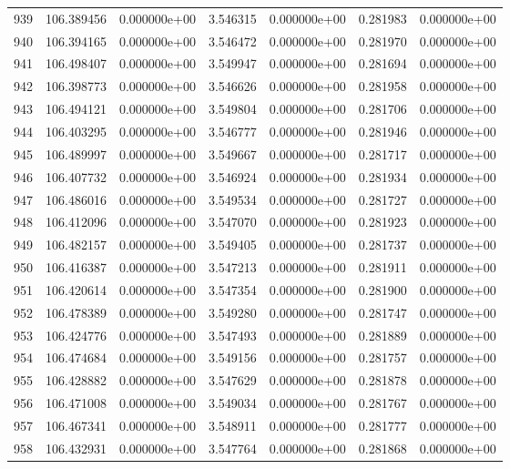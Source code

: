 \begin{tabular}{rrrrrrr}
 939 & 106.389456 &  0.000000e+00 &  3.546315 &  0.000000e+00 &    0.281983 &  0.000000e+00 \\
 940 & 106.394165 &  0.000000e+00 &  3.546472 &  0.000000e+00 &    0.281970 &  0.000000e+00 \\
 941 & 106.498407 &  0.000000e+00 &  3.549947 &  0.000000e+00 &    0.281694 &  0.000000e+00 \\
 942 & 106.398773 &  0.000000e+00 &  3.546626 &  0.000000e+00 &    0.281958 &  0.000000e+00 \\
 943 & 106.494121 &  0.000000e+00 &  3.549804 &  0.000000e+00 &    0.281706 &  0.000000e+00 \\
 944 & 106.403295 &  0.000000e+00 &  3.546777 &  0.000000e+00 &    0.281946 &  0.000000e+00 \\
 945 & 106.489997 &  0.000000e+00 &  3.549667 &  0.000000e+00 &    0.281717 &  0.000000e+00 \\
 946 & 106.407732 &  0.000000e+00 &  3.546924 &  0.000000e+00 &    0.281934 &  0.000000e+00 \\
 947 & 106.486016 &  0.000000e+00 &  3.549534 &  0.000000e+00 &    0.281727 &  0.000000e+00 \\
 948 & 106.412096 &  0.000000e+00 &  3.547070 &  0.000000e+00 &    0.281923 &  0.000000e+00 \\
 949 & 106.482157 &  0.000000e+00 &  3.549405 &  0.000000e+00 &    0.281737 &  0.000000e+00 \\
 950 & 106.416387 &  0.000000e+00 &  3.547213 &  0.000000e+00 &    0.281911 &  0.000000e+00 \\
 951 & 106.420614 &  0.000000e+00 &  3.547354 &  0.000000e+00 &    0.281900 &  0.000000e+00 \\
 952 & 106.478389 &  0.000000e+00 &  3.549280 &  0.000000e+00 &    0.281747 &  0.000000e+00 \\
 953 & 106.424776 &  0.000000e+00 &  3.547493 &  0.000000e+00 &    0.281889 &  0.000000e+00 \\
 954 & 106.474684 &  0.000000e+00 &  3.549156 &  0.000000e+00 &    0.281757 &  0.000000e+00 \\
 955 & 106.428882 &  0.000000e+00 &  3.547629 &  0.000000e+00 &    0.281878 &  0.000000e+00 \\
 956 & 106.471008 &  0.000000e+00 &  3.549034 &  0.000000e+00 &    0.281767 &  0.000000e+00 \\
 957 & 106.467341 &  0.000000e+00 &  3.548911 &  0.000000e+00 &    0.281777 &  0.000000e+00 \\
 958 & 106.432931 &  0.000000e+00 &  3.547764 &  0.000000e+00 &    0.281868 &  0.000000e+00 \\

\end{tabular}
